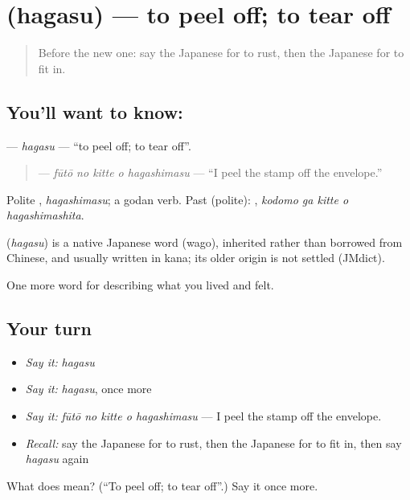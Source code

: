 \section[\texorpdfstring{\ja{はがす} (hagasu)}{はがす (hagasu)}]{ (hagasu) — to peel off; to tear off}

\label{lesson:JA-C486-hagasu}



\begin{quote}
Before the new one: say the Japanese for to rust, then the Japanese for to fit in.
\end{quote}

\subsection*{You'll want to know: }
\textbf{} — \emph{hagasu} — \textquotedblleft{}to peel off; to tear off\textquotedblright{}.

\begin{quote}
\textbf{  } — \emph{fūtō no kitte o hagashimasu} — \textquotedblleft{}I peel the stamp off the envelope.\textquotedblright{}
\end{quote}

Polite \textbf{}, \emph{hagashimasu}; a godan verb. Past (polite): \textbf{  }, \emph{kodomo ga kitte o hagashimashita}.

\begin{cousinweb}
\textbf{} (\emph{hagasu}) is a native Japanese word (wago), inherited rather than borrowed from Chinese, and usually written in kana; its older origin is not settled (JMdict).
\end{cousinweb}

\begin{grammarlens}[title={What you've built}]
One more word for describing what you lived and felt.
\end{grammarlens}

\subsection*{Your turn}
\begin{itemize}
\raggedright
  \item \emph{Say it:} \emph{hagasu}
  \item \emph{Say it:} \emph{hagasu}, once more
  \item \emph{Say it:} \emph{fūtō no kitte o hagashimasu} — I peel the stamp off the envelope.
  \item \emph{Recall:} say the Japanese for to rust, then the Japanese for to fit in, then say \emph{hagasu} again
\end{itemize}

\begin{tcolorbox}[breakable,colback=teal!4,colframe=teal!35!black,title={Before you move on}]
What does  mean? (\textquotedblleft{}To peel off; to tear off\textquotedblright{}.) Say it once more.
\end{tcolorbox}
